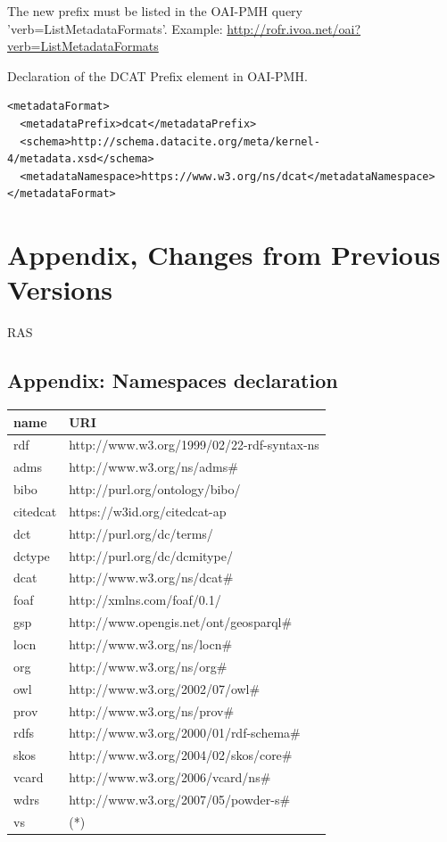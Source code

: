 \documentclass[11pt,a4paper]{ivoa}
\begin{document}
 
 The new prefix must be listed in the OAI-PMH query 'verb=ListMetadataFormats'.
 Example: \url{http://rofr.ivoa.net/oai?verb=ListMetadataFormats}
 
Declaration of the DCAT Prefix element in OAI-PMH. \begin{lstlisting}
<metadataFormat>
  <metadataPrefix>dcat</metadataPrefix>
  <schema>http://schema.datacite.org/meta/kernel-4/metadata.xsd</schema>
  <metadataNamespace>https://www.w3.org/ns/dcat</metadataNamespace>
</metadataFormat>
\end{lstlisting}
 
\appendix
\section{Appendix, Changes from Previous Versions}
RAS

\subsection{Appendix: Namespaces declaration}

\label{namespace}
\begin{tabular}{|l|l|} \hline
\textbf{name} & \textbf{URI} \\  \hline
rdf &http://www.w3.org/1999/02/22-rdf-syntax-ns\\ \hline
adms &http://www.w3.org/ns/adms\#  \\ \hline
bibo &http://purl.org/ontology/bibo/ \\ \hline 
citedcat &https://w3id.org/citedcat-ap \\ \hline 
dct &http://purl.org/dc/terms/ \\ \hline 
dctype &http://purl.org/dc/dcmitype/ \\ \hline 
dcat &http://www.w3.org/ns/dcat\# \\ \hline 
foaf &http://xmlns.com/foaf/0.1/ \\ \hline
gsp &http://www.opengis.net/ont/geosparql\# \\ \hline
locn &http://www.w3.org/ns/locn\# \\ \hline
org &http://www.w3.org/ns/org\# \\ \hline
owl &http://www.w3.org/2002/07/owl\# \\ \hline
prov &http://www.w3.org/ns/prov\# \\ \hline
rdfs &http://www.w3.org/2000/01/rdf-schema\# \\ \hline
skos &http://www.w3.org/2004/02/skos/core\# \\ \hline
vcard &http://www.w3.org/2006/vcard/ns\# \\ \hline
wdrs &http://www.w3.org/2007/05/powder-s\# \\ \hline 
vs &\color{red}{http://www.ivoa.net/xml/VODataService/v1.1\#} (*)\\ \hline
\end{tabular}
\end{document}
